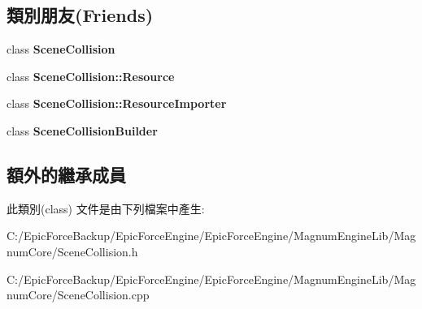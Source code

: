 \subsection*{類別朋友(Friends)}
\begin{DoxyCompactItemize}
\item 
class {\bfseries Scene\+Collision}\hypertarget{class_magnum_1_1_scene_collision_1_1_resource_a7f7f4483f99e66d8de91c12344383316}{}\label{class_magnum_1_1_scene_collision_1_1_resource_a7f7f4483f99e66d8de91c12344383316}

\item 
class {\bfseries Scene\+Collision\+::\+Resource}\hypertarget{class_magnum_1_1_scene_collision_1_1_resource_a71b236c1c24fec68b8fc80e32c6a1df9}{}\label{class_magnum_1_1_scene_collision_1_1_resource_a71b236c1c24fec68b8fc80e32c6a1df9}

\item 
class {\bfseries Scene\+Collision\+::\+Resource\+Importer}\hypertarget{class_magnum_1_1_scene_collision_1_1_resource_a7892633f22a5e0a8a9dcf89bb56cdff8}{}\label{class_magnum_1_1_scene_collision_1_1_resource_a7892633f22a5e0a8a9dcf89bb56cdff8}

\item 
class {\bfseries Scene\+Collision\+Builder}\hypertarget{class_magnum_1_1_scene_collision_1_1_resource_a2d946a399a3297cd5ab77a3604b6211e}{}\label{class_magnum_1_1_scene_collision_1_1_resource_a2d946a399a3297cd5ab77a3604b6211e}

\end{DoxyCompactItemize}
\subsection*{額外的繼承成員}


此類別(class) 文件是由下列檔案中產生\+:\begin{DoxyCompactItemize}
\item 
C\+:/\+Epic\+Force\+Backup/\+Epic\+Force\+Engine/\+Epic\+Force\+Engine/\+Magnum\+Engine\+Lib/\+Magnum\+Core/Scene\+Collision.\+h\item 
C\+:/\+Epic\+Force\+Backup/\+Epic\+Force\+Engine/\+Epic\+Force\+Engine/\+Magnum\+Engine\+Lib/\+Magnum\+Core/Scene\+Collision.\+cpp\end{DoxyCompactItemize}
